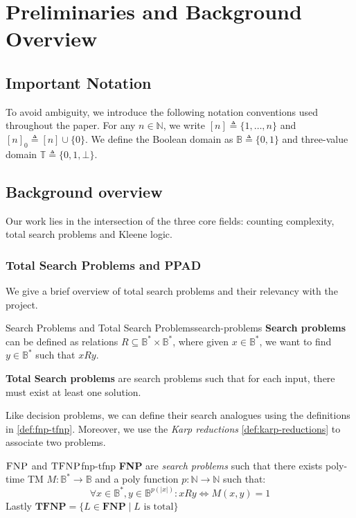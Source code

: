 \section{Preliminaries and Background Overview}

\subsection{Important Notation}

To avoid ambiguity, we introduce the following notation conventions used throughout the paper.
For any \(n \in \mathbb{N}\), we write \([n] \triangleq \{1, \ldots, n\}\)  and \([n]_0 \triangleq [n] \cup \{0\}\).
We define the Boolean domain as \(\mathbb{B} \triangleq \{0, 1\}\) and
three-value domain \(\mathbb{T} \triangleq \{0, 1, \bot\}\).


\subsection{Background overview}

Our work lies in the intersection of the three core fields:
counting complexity, total search problems and Kleene logic.

\subsubsection{Total Search Problems and PPAD}
We give a brief overview of total search problems and their relevancy with the project.

\begin{definitionbox}{Search Problems and Total Search Problems}{search-problems}
    \textbf{Search problems} can be defined as relations $R \subseteq \mathbb{B}^* \times \mathbb{B}^*$,
    where given $x \in \mathbb{B}^*$, we want to find $y \in \mathbb{B}^*$  such that $xRy$.

    \textbf{Total Search problems} are search problems such that for each input, there must exist at least one solution.
\end{definitionbox}

Like decision problems, we can define their search analogues
using the definitions in \ref{def:fnp-tfnp}.
Moreover, we use the \textit{Karp reductions} \ref{def:karp-reductions} to associate
two problems.


\begin{definitionbox}{$\textnormal{\textsc{FNP}}$ and $\textnormal{\textsc{TFNP}}$}{fnp-tfnp}
    \label{def:fnp-tfnp}
    \textbf{FNP} are \textit{search problems} such that there exists poly-time TM $M: \mathbb{B}^* \to \mathbb{B}$
    and a poly function $p : \mathbb{N} \to \mathbb{N}$ such that:
    $$
        \forall x \in \mathbb{B}^*, y \in \mathbb{B}^{p(|x|)}: xRy \iff M(x,y) = 1
    $$
    Lastly $\textbf{TFNP} = \{L \in \textbf{FNP} \mid L \text{ is total}\}$
\end{definitionbox}


